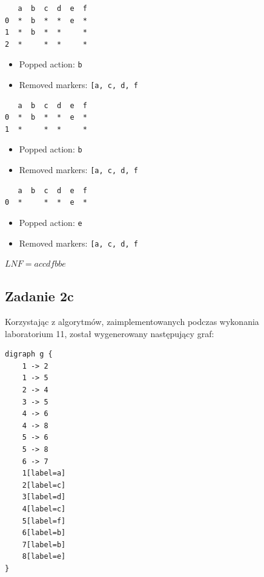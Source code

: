 \documentclass[11pt]{article}
\providecommand{\tightlist}{%
      \setlength{\itemsep}{0pt}\setlength{\parskip}{0pt}}
\begin{document}
\begin{verbatim}
   a  b  c  d  e  f
0  *  b  *  *  e  *
1  *  b  *  *     *
2  *     *  *     *
\end{verbatim}

\begin{itemize}
\tightlist
\item
  Popped action: \texttt{b}
\item
  Removed markers:
  \texttt{{[}\textquotesingle{}a\textquotesingle{},\ \textquotesingle{}c\textquotesingle{},\ \textquotesingle{}d\textquotesingle{},\ \textquotesingle{}f\textquotesingle{}{]}}
\end{itemize}

\begin{verbatim}
   a  b  c  d  e  f
0  *  b  *  *  e  *
1  *     *  *     *
\end{verbatim}

\begin{itemize}
\tightlist
\item
  Popped action: \texttt{b}
\item
  Removed markers:
  \texttt{{[}\textquotesingle{}a\textquotesingle{},\ \textquotesingle{}c\textquotesingle{},\ \textquotesingle{}d\textquotesingle{},\ \textquotesingle{}f\textquotesingle{}{]}}
\end{itemize}

\begin{verbatim}
   a  b  c  d  e  f
0  *     *  *  e  *
\end{verbatim}

\begin{itemize}
\tightlist
\item
  Popped action: \texttt{e}
\item
  Removed markers:
  \texttt{{[}\textquotesingle{}a\textquotesingle{},\ \textquotesingle{}c\textquotesingle{},\ \textquotesingle{}d\textquotesingle{},\ \textquotesingle{}f\textquotesingle{}{]}}
\end{itemize}

\(LNF = accdfbbe\)

    \hypertarget{zadanie-2c}{%
\subsection{Zadanie 2c}\label{zadanie-2c}}

Korzystając z algorytmów, zaimplementowanych podczas wykonania
laboratorium 11, został wygenerowany następujący graf:

\begin{verbatim}
digraph g {
    1 -> 2
    1 -> 5
    2 -> 4
    3 -> 5
    4 -> 6
    4 -> 8
    5 -> 6
    5 -> 8
    6 -> 7
    1[label=a]
    2[label=c]
    3[label=d]
    4[label=c]
    5[label=f]
    6[label=b]
    7[label=b]
    8[label=e]
}
\end{verbatim}
\end{document}
